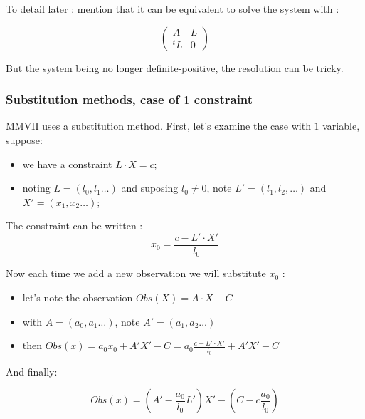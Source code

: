 To detail later : mention that it can be equivalent to solve the system with :

\begin{equation}
  \begin{pmatrix}
   A & L \\
   ^t L & 0 
  \end{pmatrix}
\end{equation}

But the system being no longer definite-positive, the resolution can be tricky.


\subsubsection{Substitution methods, case of $1$ constraint}
\label{CSTR:SUBST}

MMVII uses a substitution method. First, let's examine the case with $1$ variable, suppose:

\begin{itemize}
    \item we have a constraint $L \cdot X = c$;
    \item noting $L= (l_0,l_1 \dots)$ and suposing $l_0 \neq 0$,  note $L'=(l_1,l_2, \dots)$ and $X'=(x_1,x_2\dots)$;
\end{itemize}


The constraint can be written :
\begin{equation}
    x_0 = \frac{c-L' \cdot X'}{l_0} \label{LSQ:SUBST}
\end{equation}

Now  each time we add a new observation we will substitute $x_0$ :

\begin{itemize}
      \item let's note the observation  $Obs(X) = A \cdot X - C$
      \item with $A= (a_0,a_1 \dots)$, note  $A' = (a_1,a_2 \dots) $
       \item then   $Obs(x) = a_0 x_0 + A' X'-C= a_0\frac{c-L' \cdot X'}{l_0} + A'X' -C$
\end{itemize}

And finally:

\begin{equation}
    Obs(x) = (A'- \frac{a_0}{l_0} L') X'  - (C -c\frac{a_0}{l_0})
\end{equation}

